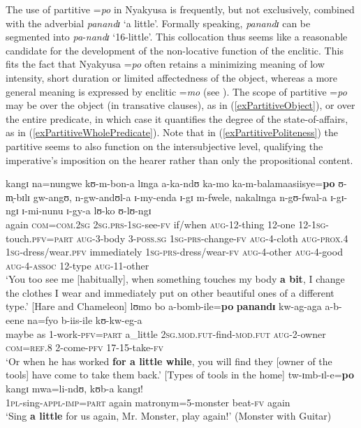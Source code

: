 The use of partitive \mbox{=\textit{po}} in Nyakyusa is frequently, but not exclusively, combined with the adverbial \textit{panandɪ} \lq a little'. Formally speaking, \textit{panandɪ} can be segmented into \textit{pa}-\textit{nandɪ} \lq 16-little'. This collocation thus seems like a reasonable candidate for the development of the non-locative function of the enclitic. This fits the fact that Nyakyusa \mbox{=\textit{po}} often retains a minimizing meaning of low intensity, short duration or limited affectedness of the object, whereas a more general  meaning is expressed by enclitic \mbox{=\textit{mo}} (see ). The scope of partitive \mbox{=\textit{po}} may be over the object (in transative clauses), as in (\ref{exPartitiveObject}), or over the entire predicate, in which case it quantifies the degree of the state-of-affairs, as in (\ref{exPartitiveWholePredicate}). Note that in (\ref{exPartitivePoliteness}) the partitive seems to also function on the intersubjective level, qualifying the imperative's imposition on the hearer rather than only the propositional content.
\begin{exe}
	\ex \label{exPartitiveObject} \gll kangɪ na=nungwe kʊ-m-bon-a lɪnga a-ka-ndʊ ka-mo ka-m-balamaasiisye=\textbf{po} ʊ-m̩-bɪlɪ gw-angʊ, n-gw-andʊl-a ɪ-my-enda ɪ-gɪ m-fwele, nakalɪnga n-gʊ-fwal-a ɪ-gɪ-ngɪ ɪ-mi-nunu ɪ-gy-a lʊ-ko ʊ-lʊ-ngɪ\\
	again \textsc{com}=\textsc{com.2sg} \textsc{2sg.prs}-\textsc{1sg}-see-\textsc{fv} if/when \textsc{aug}-12-thing 12-one 12-\textsc{1sg}-touch.\textsc{pfv}=\textsc{part} \textsc{aug}-3-body 3-\textsc{poss.sg} \textsc{1sg}-\textsc{prs}-change-\textsc{fv} \textsc{aug}-4-cloth \textsc{aug}-\textsc{prox.4} \textsc{1sg}-dress/wear.\textsc{pfv} immediately \textsc{1sg}-\textsc{prs}-dress/wear-\textsc{fv} \textsc{aug}-4-other \textsc{aug}-4-good \textsc{aug}-4-\textsc{assoc} 12-type \textsc{aug}-11-other\\
	\glt `You too see me [habitually], when something touches my body \textbf{a bit}, I change the clothes I wear and immediately put on other beautiful ones of a different type.' [Hare and Chameleon]
	\ex \label{exPartitiveWholePredicate} \gll lʊmo bo a-bomb-ile=\textbf{po} \textbf{panandɪ} kw-ag-aga a-b-eene na=fyo b-iis-ile kʊ-kw-eg-a\\
	maybe as 1-work-\textsc{pfv}=\textsc{part} a\_little \textsc{2sg.mod.fut}-find-\textsc{mod.fut} \textsc{aug}-2-owner \textsc{com}=\textsc{ref.8} 2-come-\textsc{pfv} 17-15-take-\textsc{fv}\\
	\glt \lq Or when he has worked \textbf{for a little while}, you will find they [owner of the tools] have come to take them back.' [Types of tools in the home]%
	\ex \label{exPartitivePoliteness} \gll tw-ɪmb-ɪl-e=\textbf{po} kangɪ mwa=li-ndʊ, kʊb-a kangɪ!\\
	\textsc{1pl}-sing-\textsc{appl}-\textsc{imp}=\textsc{part} again matronym=5-monster beat-\textsc{fv} again\\
	\glt \lq Sing \textbf{a little} for us again, Mr. Monster, play again!' (Monster with Guitar)
\end{exe}

